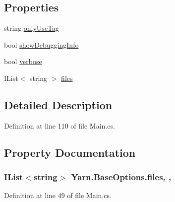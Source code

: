 \subsection*{Properties}
\begin{DoxyCompactItemize}
\item 
string \hyperlink{a00104_a8b30c1b7fb1b74eae455a568c1024b3d}{only\-Use\-Tag}
\item 
bool \hyperlink{a00042_a89964ea17bd19caf00cb5bff563ed01c}{show\-Debugging\-Info}
\item 
bool \hyperlink{a00042_ada4d83d1756918f362d55f6649b82b17}{verbose}
\item 
I\-List$<$ string $>$ \hyperlink{a00042_aa93cbb1bc1d5328e0a417012621e92d2}{files}
\end{DoxyCompactItemize}


\subsection{Detailed Description}


Definition at line 110 of file Main.\-cs.



\subsection{Property Documentation}
\hypertarget{a00042_aa93cbb1bc1d5328e0a417012621e92d2}{
\subsubsection[{files}]{\setlength{\rightskip}{0pt plus 5cm}I\-List$<$string$>$ Yarn.\-Base\-Options.\-files\hspace{0.3cm}{\ttfamily [get]}, {\ttfamily [set]}, {\ttfamily [inherited]}}}\label{a00042_aa93cbb1bc1d5328e0a417012621e92d2}


Definition at line 49 of file Main.\-cs.



